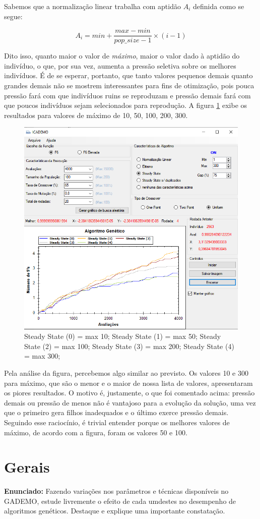 \documentclass[12pt]{article}
\begin{document}
Sabemos que a normalização linear trabalha com aptidão $A_i$ definida como se segue:

\begin{equation*}
	A_i=min+\dfrac{max-min}{pop\_size-1}\times (i-1)
\end{equation*}

Dito isso, quanto maior o valor de \textit{máximo}, maior o valor dado à aptidão do indivíduo, o que, por sua vez, aumenta a pressão seletiva sobre os melhores indivíduos. É de se esperar, portanto, que tanto valores pequenos demais quanto grandes demais não se mostrem interessantes para fins de otimização, pois pouca pressão fará com que indivíduos ruins se reproduzam e pressão demais fará com que poucos indivíduos sejam selecionados para reprodução. A figura \ref{fig:questao7} exibe os resultados para valores de máximo de 10, 50, 100, 200, 300.

\begin{figure}[H]
	\centering
	\includegraphics[width=0.7\linewidth]{Imagens/questao7}
	\caption{Steady State (0) = max 10; Steady State (1) = max 50; Steady State (2) = max 100; Steady State (3) = max 200; Steady State (4) = max 300;}
	\label{fig:questao7}
\end{figure}

Pela análise da figura, percebemos algo similar ao previsto. Os valores 10 e 300 para máximo, que são o menor e o maior de nossa lista de valores, apresentaram os piores resultados. O motivo é, justamente, o que foi comentado acima: pressão demais ou pressão de menos não é vantajoso para a evolução da solução, uma vez que o primeiro gera filhos inadequados e o último exerce pressão demais.  Seguindo esse raciocínio, é trivial entender porque os melhores valores de máximo, de acordo com a figura, foram os valores 50 e 100.

\section{Gerais}
\textbf{Enunciado:}
Fazendo variações nos parâmetros e técnicas disponíveis no GADEMO, estude livremente o efeito de cada umdestes no desempenho de algoritmos genéticos. Destaque e explique uma importante constatação.

	 
	
\end{document}
